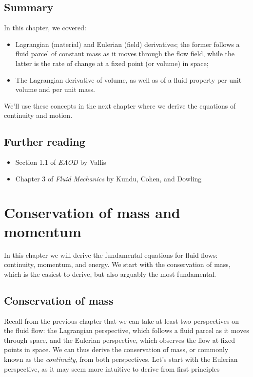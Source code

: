 \documentclass[12pt]{article}
\numberwithin{equation}{section}
\numberwithin{figure}{section}
\numberwithin{table}{section}
\begin{document}

\subsection{Summary}

In this chapter, we covered:

\begin{itemize}
  \item Lagrangian (material) and Eulerian (field) derivatives;
  the former follows a fluid parcel of constant mass as it moves through
  the flow field, while the latter is the rate of change at a fixed point
  (or volume) in space;
  \item The Lagrangian derivative of volume, as well as of a fluid property per
  unit volume and per unit mass.
\end{itemize}

We'll use these concepts in the next chapter where we derive the equations of
continuity and motion.

\subsection*{Further reading}

\begin{itemize}
  \item Section 1.1 of \textit{EAOD} by Vallis
  \item Chapter 3 of \textit{Fluid Mechanics} by Kundu, Cohen, and Dowling
\end{itemize}

\newpage
\section{Conservation of mass and momentum}

In this chapter we will derive the fundamental equations for fluid flows:
continuity, momentum, and energy.
We start with the conservation of mass, which is the easiest to derive, but also
arguably the most fundamental.

\subsection{Conservation of mass}

Recall from the previous chapter that we can take at least two perspectives
on the fluid flow: the Lagrangian perspective, which follows a fluid parcel as it
moves through space, and the Eulerian perspective, which observes the flow at
fixed points in space.
We can thus derive the conservation of mass, or commonly known as the
\textit{continuity}, from both perspectives.
Let's start with the Eulerian perspective, as it may seem more intuitive to
derive from first principles
\end{document}
